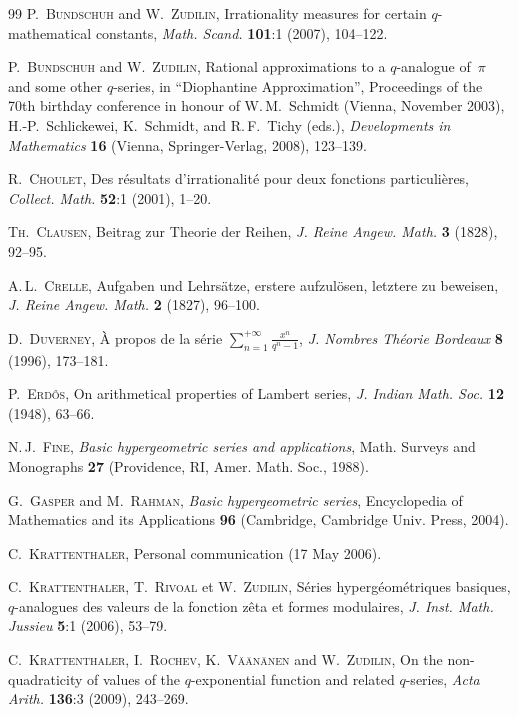 \documentclass[12pt,reqno]{amsart}
\theoremstyle{remark}
\begin{document}
\begin{thebibliography}{99}
\textsc{P.~Bundschuh} and \textsc{W.~Zudilin},
Irrationality measures for certain $q$-mathematical constants,
\emph{Math. Scand.} \textbf{101}:1 (2007), 104--122.

\textsc{P.~Bundschuh} and \textsc{W.~Zudilin},
Rational approximations to a $q$-analogue of~$\pi$ and some other $q$-series,
in ``Diophantine Approximation'',
Proceedings of the 70th birthday conference in honour of
W.\,M.~Schmidt (Vienna, November 2003),
H.-P.~Schlickewei, K.~Schmidt, and R.\,F.~Tichy (eds.),
\emph{Developments in Mathematics} \textbf{16} (Vienna, Springer-Verlag, 2008), 123--139.

\textsc{R.~Choulet},
Des r\'esultats d'irrationalit\'e pour deux fonctions particuli\`eres,
\emph{Collect. Math.} \textbf{52}:1 (2001), 1--20.

\textsc{Th.~Clausen},
Beitrag zur Theorie der Reihen,
\emph{J. Reine Angew. Math.} \textbf{3} (1828), 92--95.

\textsc{A.\,L.~Crelle},
Aufgaben und Lehrs\"atze, erstere aufzul\"osen, letztere zu beweisen,
\emph{J. Reine Angew. Math.} \textbf{2} (1827), 96--100.

\textsc{D.~Duverney},
\`A propos de la s\'erie $\sum_{n=1}^{+\infty}\frac{x^n}{q^n-1}$,
\emph{J. Nombres Th\'eorie Bordeaux} \textbf{8} (1996), 173--181.

\textsc{P.~Erd\H os},
On arithmetical properties of Lambert series,
\emph{J. Indian Math. Soc.} \textbf{12} (1948), 63--66.

\textsc{N.\,J.~Fine},
\emph{Basic hypergeometric series and applications},
Math. Surveys and Monographs \textbf{27} (Providence, RI, Amer. Math. Soc., 1988).

\textsc{G.~Gasper} and \textsc{M.~Rahman},
\emph{Basic hypergeometric series},
Encyclopedia of Mathematics and its Applications \textbf{96} (Cambridge, Cambridge Univ. Press, 2004).

\textsc{C.~Krattenthaler},
Personal communication (17 May 2006).

\textsc{C.~Krattenthaler}, \textsc{T.~Rivoal} et \textsc{W.~Zudilin},
S\'eries hyperg\'eom\'etriques basiques, $q$-anal\-ogues des valeurs de la fonction z\^eta et formes modulaires,
\emph{J. Inst. Math. Jussieu} \textbf{5}:1 (2006), 53--79.

\textsc{C.~Krattenthaler}, \textsc{I.~Rochev}, \textsc{K.~V\"a\"an\"anen} and \textsc{W.~Zudilin},
On the non-quadraticity of values of the $q$-exponential function and related $q$-series,
\emph{Acta Arith.} \textbf{136}:3 (2009), 243--269.


\end{thebibliography}
\end{document}
